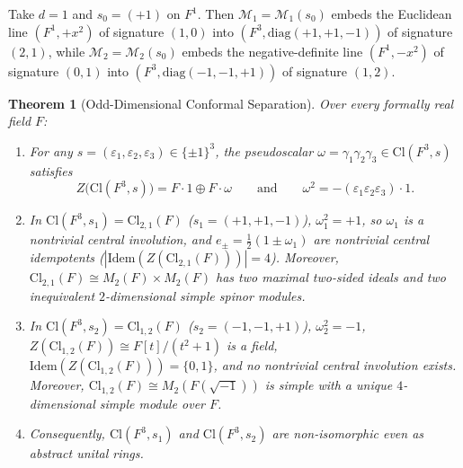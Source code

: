 \documentclass[11pt]{article}
\newtheorem{theorem}{Theorem}[section]
\theoremstyle{definition}
\newcommand{\Cl}{\mathrm{Cl}}
\newcommand{\Idem}{\mathrm{Idem}}
\newcommand{\diag}{\mathrm{diag}}
\begin{document}
Take $d = 1$ and $s_0 = (+1)$ on $F^1$. Then $\mathcal{M}_1 = \mathcal{M}_1(s_0)$ embeds the Euclidean line $(F^1, +x^2)$ of signature $(1, 0)$ into $(F^3, \diag(+1, +1, -1))$ of signature $(2, 1)$, while $\mathcal{M}_2 = \mathcal{M}_2(s_0)$ embeds the negative-definite line $(F^1, -x^2)$ of signature $(0, 1)$ into $(F^3, \diag(-1, -1, +1))$ of signature $(1, 2)$.

\begin{theorem}[Odd-Dimensional Conformal Separation]\label{thm:odd-sep}
Over every formally real field $F$:
\begin{enumerate}
  \item For any $s = (\varepsilon_1, \varepsilon_2, \varepsilon_3) \in \{\pm 1\}^3$, the pseudoscalar $\omega = \gamma_1 \gamma_2 \gamma_3 \in \Cl(F^3, s)$ satisfies
  \[
    Z\bigl(\Cl(F^3, s)\bigr) = F\cdot 1 \oplus F\cdot \omega \qquad\text{and}\qquad \omega^2 = -(\varepsilon_1 \varepsilon_2 \varepsilon_3)\cdot 1.
  \]
  \item In $\Cl(F^3, s_1) = \Cl_{2,1}(F)$ ($s_1 = (+1, +1, -1)$), $\omega_1^2 = +1$, so $\omega_1$ is a nontrivial central involution, and $e_\pm = \frac{1}{2}(1 \pm \omega_1)$ are nontrivial central idempotents ($|\Idem(Z(\Cl_{2,1}(F)))| = 4$). Moreover, $\Cl_{2,1}(F) \cong M_2(F) \times M_2(F)$ has two maximal two-sided ideals and two inequivalent $2$-dimensional simple spinor modules.
  \item In $\Cl(F^3, s_2) = \Cl_{1,2}(F)$ ($s_2 = (-1, -1, +1)$), $\omega_2^2 = -1$, $Z(\Cl_{1,2}(F)) \cong F[t]/(t^2 + 1)$ is a field, $\Idem(Z(\Cl_{1,2}(F))) = \{0, 1\}$, and no nontrivial central involution exists. Moreover, $\Cl_{1,2}(F) \cong M_2(F(\sqrt{-1}))$ is simple with a unique $4$-dimensional simple module over $F$.
  \item Consequently, $\Cl(F^3, s_1)$ and $\Cl(F^3, s_2)$ are non-isomorphic even as abstract unital rings.
\end{enumerate}
\end{theorem}
\end{document}
